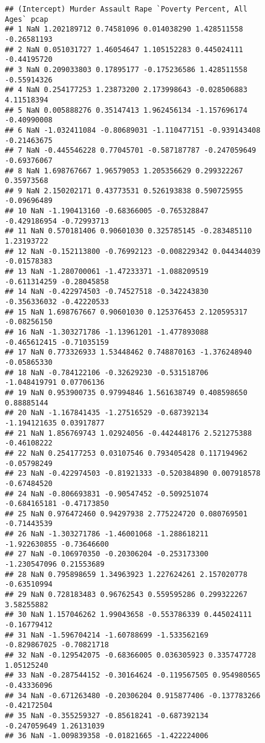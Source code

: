 \documentclass[]{article}
\begin{document}
\begin{verbatim}
## (Intercept) Murder Assault Rape `Poverty Percent, All
Ages` pcap
## 1 NaN 1.202189712 0.74581096 0.014038290 1.428511558
-0.26581193
## 2 NaN 0.051031727 1.46054647 1.105152283 0.445024111
-0.44195720
## 3 NaN 0.209033803 0.17895177 -0.175236586 1.428511558
-0.55914326
## 4 NaN 0.254177253 1.23873200 2.173998643 -0.028506883
4.11518394
## 5 NaN 0.005888276 0.35147413 1.962456134 -1.157696174
-0.40990008
## 6 NaN -1.032411084 -0.80689031 -1.110477151 -0.939143408
-0.21463675
## 7 NaN -0.445546228 0.77045701 -0.587187787 -0.247059649
-0.69376067
## 8 NaN 1.698767667 1.96579053 1.205356629 0.299322267
0.35973568
## 9 NaN 2.150202171 0.43773531 0.526193838 0.590725955
-0.09696489
## 10 NaN -1.190413160 -0.68366005 -0.765328847
-0.429186954 -0.72993713
## 11 NaN 0.570181406 0.90601030 0.325785145 -0.283485110
1.23193722
## 12 NaN -0.152113800 -0.76992123 -0.008229342 0.044344039
-0.01578383
## 13 NaN -1.280700061 -1.47233371 -1.088209519
-0.611314259 -0.28045858
## 14 NaN -0.422974503 -0.74527518 -0.342243830
-0.356336032 -0.42220533
## 15 NaN 1.698767667 0.90601030 0.125376453 2.120595317
-0.08256150
## 16 NaN -1.303271786 -1.13961201 -1.477893088
-0.465612415 -0.71035159
## 17 NaN 0.773326933 1.53448462 0.748870163 -1.376248940
-0.05865330
## 18 NaN -0.784122106 -0.32629230 -0.531518706
-1.048419791 0.07706136
## 19 NaN 0.953900735 0.97994846 1.561638749 0.408598650
0.88885144
## 20 NaN -1.167841435 -1.27516529 -0.687392134
-1.194121635 0.03917877
## 21 NaN 1.856769743 1.02924056 -0.442448176 2.521275388
-0.46108222
## 22 NaN 0.254177253 0.03107546 0.793405428 0.117194962
-0.05798249
## 23 NaN -0.422974503 -0.81921333 -0.520384890 0.007918578
-0.67484520
## 24 NaN -0.806693831 -0.90547452 -0.509251074
-0.684165181 -0.47173850
## 25 NaN 0.976472460 0.94297938 2.775224720 0.080769501
-0.71443539
## 26 NaN -1.303271786 -1.46001068 -1.288618211
-1.922630855 -0.73646600
## 27 NaN -0.106970350 -0.20306204 -0.253173300
-1.230547096 0.21553689
## 28 NaN 0.795898659 1.34963923 1.227624261 2.157020778
-0.63510994
## 29 NaN 0.728183483 0.96762543 0.559595286 0.299322267
3.58255882
## 30 NaN 1.157046262 1.99043658 -0.553786339 0.445024111
-0.16779412
## 31 NaN -1.596704214 -1.60788699 -1.533562169
-0.829867025 -0.70821718
## 32 NaN -0.129542075 -0.68366005 0.036305923 0.335747728
1.05125240
## 33 NaN -0.287544152 -0.30164624 -0.119567505 0.954980565
-0.43336096
## 34 NaN -0.671263480 -0.20306204 0.915877406 -0.137783266
-0.42172504
## 35 NaN -0.355259327 -0.85618241 -0.687392134
-0.247059649 1.26131039
## 36 NaN -1.009839358 -0.01821665 -1.422224006

\end{verbatim}
\end{document}
